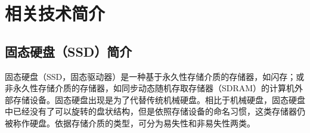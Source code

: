 
\chapter{相关技术简介}
\label{cha:related_work}

\section{固态硬盘（SSD）简介}
\label{sec:SSD}

固态硬盘（SSD，固态驱动器）是一种基于永久性存储介质的存储器，如闪存；或非永久性存储介质的存储器，如同步动态随机存取存储器（SDRAM）的计算机外部存储设备。固态硬盘出现是为了代替传统机械硬盘。相比于机械硬盘，固态硬盘中已经没有了可以旋转的盘状结构，但是依照存储设备的命名习惯，这类存储器仍被称作硬盘。依据存储介质的类型，可分为易失性和非易失性两类。

